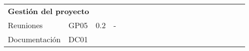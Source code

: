 \begin{longtable}[c]{llclllllllllllllllll}
        \multicolumn{4}{|l|}{\textbf{Gestión del proyecto}}                                                                                                                                                                                                                                                                                                                                & \multicolumn{15}{l|}{}                                                                                                                                                                                                                                                                                                                                                                                                                                                                                                                    &  \\ \cline{1-19}
        \multicolumn{1}{|l|}{Reuniones}                                                                                         & \multicolumn{1}{l|}{GP05}                                                      & \multicolumn{1}{l|}{0.2}                                                         & \multicolumn{1}{l|}{-}                                                               &                                 &                                 &                                 &                                 &                                 &                                 &                                 &                                 & \cellcolor[HTML]{EF8787}        &                                 &                                 &                                 &                                 &                                 & \multicolumn{1}{l|}{}                         &  \\ \cline{1-4}
        \multicolumn{1}{|l|}{Documentación}                                                                                     & \multicolumn{1}{l|}{DC01}                                                      & \multicolumn{1}{l|}{}                                                            & \multicolumn{1}{l|}{}                                                                &                                 &                                 &                                 &                                 &                                 &                                 &                                 &                                 &                                 &                                 &                                 &                                 &                                 &                                 & \multicolumn{1}{l|}{}                         &  \\ \cline{1-19}

\end{longtable}

